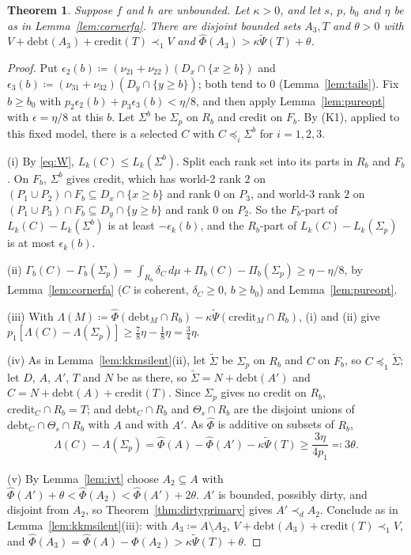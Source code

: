 \documentclass[11pt]{article}
\newtheorem{theorem}{Theorem}
\theoremstyle{definition}\newtheorem{definition}[theorem]{Definition}
\theoremstyle{remark}\newtheorem{remark}[theorem]{Remark}
\newcommand{\debt}{\mathrm{debt}}
\newcommand{\cred}{\mathrm{credit}}
\newcommand{\Phihat}{\widehat\Phi}
\newcommand{\Psitil}{\widetilde\Psi}
\begin{document}
\begin{theorem}\label{thm:kkmfa}
Suppose $f$ and $h$ are unbounded. Let $\kappa>0$, and let $s$, $p$, $b_0$
and $\eta$ be as in Lemma~\ref{lem:cornerfa}. There are disjoint bounded sets
$A_3,T$ and $\theta>0$ with $V+\debt(A_3)+\cred(T)\prec_1V$ and
$\Phihat(A_3)>\kappa\Psitil(T)+\theta$.
\end{theorem}
\begin{proof}
Put $\epsilon_2(b)\coloneqq(\nu_{21}+\nu_{22})(D_x\cap\{x\ge b\})$ and
$\epsilon_3(b)\coloneqq(\nu_{31}+\nu_{32})(D_y\cap\{y\ge b\})$; both tend to
$0$ (Lemma~\ref{lem:tails}). Fix $b\ge b_0$ with
$p_2\epsilon_2(b)+p_3\epsilon_3(b)<\eta/8$, and then apply
Lemma~\ref{lem:pureopt} with $\epsilon=\eta/8$ at this $b$. Let $\Sigma^b$ be
$\Sigma_p$ on $R_b$ and credit on $F_b$. By (K1), applied to this fixed
model, there is a selected $C$ with $C\preceq_i\Sigma^b$ for $i=1,2,3$.

(i) By \eqref{eq:W}, $L_k(C)\le L_k(\Sigma^b)$. Split each rank set into its
parts in $R_b$ and $F_b$. On $F_b$, $\Sigma^b$ gives credit, which has
world-2 rank $2$ on $(P_1\cup P_2)\cap F_b\subseteq D_x\cap\{x\ge b\}$ and
rank $0$ on $P_3$, and world-3 rank $2$ on $(P_1\cup P_3)\cap
F_b\subseteq D_y\cap\{y\ge b\}$ and rank $0$ on $P_2$. So the $F_b$-part of
$L_k(C)-L_k(\Sigma^b)$ is at least $-\epsilon_k(b)$, and the $R_b$-part of
$L_k(C)-L_k(\Sigma_p)$ is at most $\epsilon_k(b)$.

(ii) $\Gamma_b(C)-\Gamma_b(\Sigma_p)=\int_{R_b}\delta_C\,d\mu+\Pi_b(C)-
\Pi_b(\Sigma_p)\ge\eta-\eta/8$, by Lemma~\ref{lem:cornerfa} ($C$ is
coherent, $\delta_C\ge0$, $b\ge b_0$) and Lemma~\ref{lem:pureopt}.

(iii) With $\Lambda(M)\coloneqq\Phihat(\debt_M\cap R_b)-\kappa
\Psitil(\cred_M\cap R_b)$, (i) and (ii) give $p_1[\Lambda(C)-
\Lambda(\Sigma_p)]\ge\frac78\eta-\frac18\eta=\frac34\eta$.

(iv) As in Lemma~\ref{lem:kkmsilent}(ii), let $\widetilde\Sigma$ be
$\Sigma_p$ on $R_b$ and $C$ on $F_b$, so $C\preceq_1\widetilde\Sigma$; let
$D$, $A$, $A'$, $T$ and $N$ be as there, so $\widetilde\Sigma=N+\debt(A')$
and $C=N+\debt(A)+\cred(T)$. Since $\Sigma_p$ gives no credit on $R_b$,
$\cred_C\cap R_b=T$; and $\debt_C\cap R_b$ and $\Theta_s\cap R_b$ are the
disjoint unions of $\debt_C\cap\Theta_s\cap R_b$ with $A$ and with $A'$. As
$\Phihat$ is additive on subsets of $R_b$,
\[
 \Lambda(C)-\Lambda(\Sigma_p)=\Phihat(A)-\Phihat(A')-\kappa\Psitil(T)\ge
 \frac{3\eta}{4p_1}\eqqcolon3\theta .
\]

(v) By Lemma~\ref{lem:ivt} choose $A_2\subseteq A$ with
$\Phihat(A')+\theta<\Phihat(A_2)<\Phihat(A')+2\theta$. $A'$ is bounded,
possibly dirty, and disjoint from $A_2$, so Theorem~\ref{thm:dirtyprimary}
gives $A'\prec_dA_2$. Conclude as in Lemma~\ref{lem:kkmsilent}(iii): with
$A_3\coloneqq A\setminus A_2$, $V+\debt(A_3)+\cred(T)\prec_1V$, and
$\Phihat(A_3)=\Phihat(A)-\Phihat(A_2)>\kappa\Psitil(T)+\theta$.
\end{proof}
\end{document}
